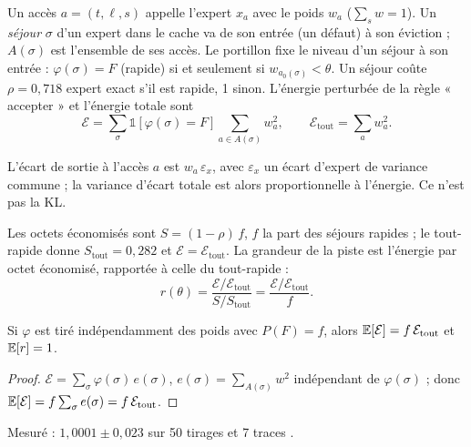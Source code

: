Un accès $a = (t, \ell, s)$ appelle l'expert $x_a$ avec le poids $w_a$ ($\sum_s w = 1$). Un \emph{séjour} $\sigma$ d'un expert dans le cache va de son entrée (un défaut) à son éviction ; $A(\sigma)$ est l'ensemble de ses accès. Le portillon fixe le niveau d'un séjour à son entrée : $\varphi(\sigma) = F$ (rapide) si et seulement si $w_{a_0(\sigma)} < \theta$. Un séjour coûte $\rho = 0{,}718$ expert exact s'il est rapide, 1 sinon. L'énergie perturbée de la règle « accepter » et l'énergie totale sont
\begin{equation}\label{t3mim:eq:p6-energie}
\mathcal E = \sum_\sigma \mathbb{1}[\varphi(\sigma) = F] \sum_{a \in A(\sigma)} w_a^2, \qquad \mathcal E_{\text{tout}} = \sum_a w_a^2 .
\end{equation}
\begin{hypothese}\label{t3mim:hyp:energie}
L'écart de sortie à l'accès $a$ est $w_a\,\varepsilon_x$, avec $\varepsilon_x$ un écart d'expert de variance commune ; la variance d'écart totale est alors proportionnelle à l'énergie. Ce n'est pas la KL.
\end{hypothese}
Les octets économisés sont $S = (1 - \rho)\,f$, $f$ la part des séjours rapides ; le tout-rapide donne $S_{\text{tout}} = 0{,}282$ et $\mathcal E = \mathcal E_{\text{tout}}$. La grandeur de la piste est l'énergie par octet économisé, rapportée à celle du tout-rapide :
\begin{equation}\label{t3mim:eq:p6-r}
r(\theta) = \frac{\mathcal E/\mathcal E_{\text{tout}}}{S / S_{\text{tout}}} = \frac{\mathcal E/\mathcal E_{\text{tout}}}{f} .
\end{equation}

\begin{proposition}\label{t3mim:prop:p6-hasard}
Si $\varphi$ est tiré indépendamment des poids avec $P(F) = f$, alors $\mathbb{E}[\mathcal E] = f\,\mathcal E_{\text{tout}}$ et $\mathbb{E}[r] = 1$.
\end{proposition}
\begin{proof}
$\mathcal E = \sum_\sigma \varphi(\sigma)\,e(\sigma)$, $e(\sigma) = \sum_{A(\sigma)} w^2$ indépendant de $\varphi(\sigma)$ ; donc $\mathbb{E}[\mathcal E] = f \sum_\sigma e(\sigma) = f\,\mathcal E_{\text{tout}}$.
\end{proof}
Mesuré : $1{,}0001 \pm 0{,}023$ sur 50 tirages et 7 traces \mes.

